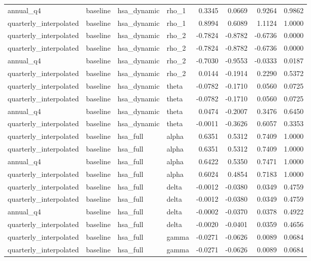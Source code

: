 \begin{tabular}{llllrrrr}
annual\_q4 & baseline & hsa\_dynamic & rho\_1 & 0.3345 & 0.0669 & 0.9264 & 0.9862 \\
quarterly\_interpolated & baseline & hsa\_dynamic & rho\_1 & 0.8994 & 0.6089 & 1.1124 & 1.0000 \\
quarterly\_interpolated & baseline & hsa\_dynamic & rho\_2 & -0.7824 & -0.8782 & -0.6736 & 0.0000 \\
quarterly\_interpolated & baseline & hsa\_dynamic & rho\_2 & -0.7824 & -0.8782 & -0.6736 & 0.0000 \\
annual\_q4 & baseline & hsa\_dynamic & rho\_2 & -0.7030 & -0.9553 & -0.0333 & 0.0187 \\
quarterly\_interpolated & baseline & hsa\_dynamic & rho\_2 & 0.0144 & -0.1914 & 0.2290 & 0.5372 \\
quarterly\_interpolated & baseline & hsa\_dynamic & theta & -0.0782 & -0.1710 & 0.0560 & 0.0725 \\
quarterly\_interpolated & baseline & hsa\_dynamic & theta & -0.0782 & -0.1710 & 0.0560 & 0.0725 \\
annual\_q4 & baseline & hsa\_dynamic & theta & 0.0474 & -0.2007 & 0.3476 & 0.6450 \\
quarterly\_interpolated & baseline & hsa\_dynamic & theta & -0.0011 & -0.3626 & 0.6057 & 0.3353 \\
quarterly\_interpolated & baseline & hsa\_full & alpha & 0.6351 & 0.5312 & 0.7409 & 1.0000 \\
quarterly\_interpolated & baseline & hsa\_full & alpha & 0.6351 & 0.5312 & 0.7409 & 1.0000 \\
annual\_q4 & baseline & hsa\_full & alpha & 0.6422 & 0.5350 & 0.7471 & 1.0000 \\
quarterly\_interpolated & baseline & hsa\_full & alpha & 0.6024 & 0.4854 & 0.7183 & 1.0000 \\
quarterly\_interpolated & baseline & hsa\_full & delta & -0.0012 & -0.0380 & 0.0349 & 0.4759 \\
quarterly\_interpolated & baseline & hsa\_full & delta & -0.0012 & -0.0380 & 0.0349 & 0.4759 \\
annual\_q4 & baseline & hsa\_full & delta & -0.0002 & -0.0370 & 0.0378 & 0.4922 \\
quarterly\_interpolated & baseline & hsa\_full & delta & -0.0020 & -0.0401 & 0.0359 & 0.4656 \\
quarterly\_interpolated & baseline & hsa\_full & gamma & -0.0271 & -0.0626 & 0.0089 & 0.0684 \\
quarterly\_interpolated & baseline & hsa\_full & gamma & -0.0271 & -0.0626 & 0.0089 & 0.0684 \\

\end{tabular}
